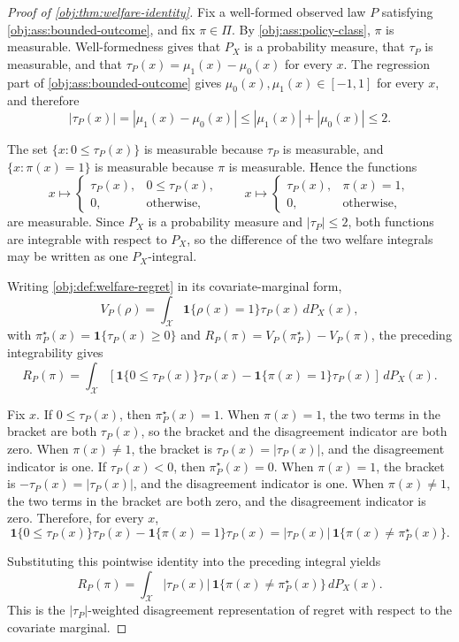 \begin{proof}[Proof of \cref{obj:thm:welfare-identity}]
Fix a well-formed observed law \(P\) satisfying \cref{obj:ass:bounded-outcome}, and fix \(\pi\in\Pi\).  By \cref{obj:ass:policy-class}, \(\pi\) is measurable.  Well-formedness gives that \(P_X\) is a probability measure, that \(\tau_P\) is measurable, and that
\(\tau_P(x)=\mu_1(x)-\mu_0(x)\) for every \(x\).  The regression part of \cref{obj:ass:bounded-outcome} gives
\(\mu_0(x),\mu_1(x)\in[-1,1]\) for every \(x\), and therefore
\[
|\tau_P(x)|
=
|\mu_1(x)-\mu_0(x)|
\le |\mu_1(x)|+|\mu_0(x)|
\le 2 .
\]

The set \(\{x:0\le\tau_P(x)\}\) is measurable because \(\tau_P\) is measurable, and \(\{x:\pi(x)=1\}\) is measurable because \(\pi\) is measurable.  Hence the functions
\[
x\mapsto
\begin{cases}
\tau_P(x),&0\le \tau_P(x),\\
0,&\text{otherwise},
\end{cases}
\qquad
x\mapsto
\begin{cases}
\tau_P(x),&\pi(x)=1,\\
0,&\text{otherwise},
\end{cases}
\]
are measurable.  Since \(P_X\) is a probability measure and \(|\tau_P|\le2\), both functions are integrable with respect to \(P_X\), so the difference of the two welfare integrals may be written as one \(P_X\)-integral.

Writing \cref{obj:def:welfare-regret} in its covariate-marginal form,
\[
V_P(\rho)=\int_{\mathcal X}\mathbf 1\{\rho(x)=1\}\tau_P(x)\,dP_X(x),
\]
with \(\pi^\star_P(x)=\mathbf 1\{\tau_P(x)\ge0\}\) and \(R_P(\pi)=V_P(\pi^\star_P)-V_P(\pi)\), the preceding integrability gives
\[
R_P(\pi)
=
\int_{\mathcal X}
\left[
\mathbf 1\{0\le\tau_P(x)\}\tau_P(x)
-
\mathbf 1\{\pi(x)=1\}\tau_P(x)
\right] \,dP_X(x).
\]

Fix \(x\).  If \(0\le\tau_P(x)\), then \(\pi^\star_P(x)=1\).  When \(\pi(x)=1\), the two terms in the bracket are both \(\tau_P(x)\), so the bracket and the disagreement indicator are both zero.  When \(\pi(x)\ne1\), the bracket is \(\tau_P(x)=|\tau_P(x)|\), and the disagreement indicator is one.  If \(\tau_P(x)<0\), then \(\pi^\star_P(x)=0\).  When \(\pi(x)=1\), the bracket is \(-\tau_P(x)=|\tau_P(x)|\), and the disagreement indicator is one.  When \(\pi(x)\ne1\), the two terms in the bracket are both zero, and the disagreement indicator is zero.  Therefore, for every \(x\),
\[
\mathbf 1\{0\le\tau_P(x)\}\tau_P(x)
-
\mathbf 1\{\pi(x)=1\}\tau_P(x)
=
|\tau_P(x)|\,\mathbf 1\{\pi(x)\ne\pi^\star_P(x)\}.
\]

Substituting this pointwise identity into the preceding integral yields
\[
R_P(\pi)
=
\int_{\mathcal X}
|\tau_P(x)|\,\mathbf 1\{\pi(x)\ne\pi^\star_P(x)\}\,dP_X(x).
\]
This is the \(|\tau_P|\)-weighted disagreement representation of regret with respect to the covariate marginal.
\end{proof}

